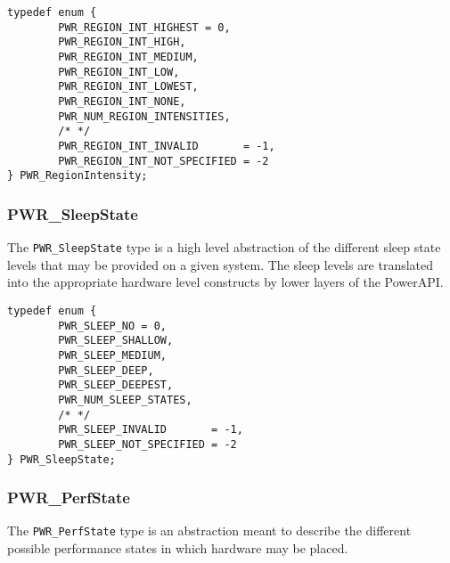 \documentclass[12pt]{report} %
\begin{document}
\begin{center}
\begin{minipage}{.95\linewidth}%
\begin{lstlisting}
typedef enum {
        PWR_REGION_INT_HIGHEST = 0,
        PWR_REGION_INT_HIGH,
        PWR_REGION_INT_MEDIUM,
        PWR_REGION_INT_LOW,
        PWR_REGION_INT_LOWEST,
        PWR_REGION_INT_NONE,
        PWR_NUM_REGION_INTENSITIES,
        /* */
        PWR_REGION_INT_INVALID       = -1,
        PWR_REGION_INT_NOT_SPECIFIED = -2
} PWR_RegionIntensity;
\end{lstlisting}
\end{minipage}
\end{center}


\subsubsection{PWR_SleepState}\label{type:SleepState}

The \texttt{PWR_SleepState} type is a high level abstraction of the different sleep
state levels that may be provided on a given system. The sleep levels are translated into
the appropriate hardware level constructs by lower layers of the PowerAPI. 

\begin{center}
\begin{minipage}{.95\linewidth}%
\begin{lstlisting}
typedef enum {
        PWR_SLEEP_NO = 0,
        PWR_SLEEP_SHALLOW,
        PWR_SLEEP_MEDIUM,
        PWR_SLEEP_DEEP,
        PWR_SLEEP_DEEPEST,
        PWR_NUM_SLEEP_STATES,
        /* */
        PWR_SLEEP_INVALID       = -1,
        PWR_SLEEP_NOT_SPECIFIED = -2
} PWR_SleepState; 
\end{lstlisting}
\end{minipage}
\end{center}


\subsubsection{PWR_PerfState}\label{type:PerfState}

The \texttt{PWR_PerfState} type is an abstraction meant to describe the different
possible performance states in which hardware may be placed.
\end{document}
